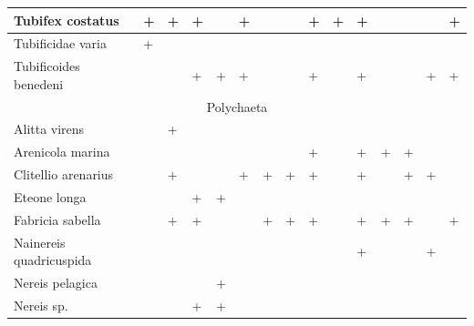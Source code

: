 \begin{footnotesize}
\begin{longtable}{|p{2cm}|p{0.4cm}p{0.4cm}|p{0.4cm}p{0.4cm}|p{0.4cm}p{0.4cm}|p{0.35cm}p{0.35cm}p{0.35cm}|p{1cm}|p{0.5cm}p{0.5cm}|p{1cm}|p{1cm}|}
Tubifex costatus          & +         & +         & +         &           & +         &           &          & +        & +        & +               &          &          &          & +          \\  \hline
Tubificidae varia         & +         &           &           &           &           &           &          &          &          &                 &          &          &          &            \\  \hline
Tubificoides benedeni     &           &           & +         & +         & +         &           &          & +        &          & +               &          &          & +        & +          \\ \hline
\multicolumn{15}{|c|}{Polychaeta} \\ \hline
Alitta virens             &           & +         &           &           &           &           &          &          &          &                 &          &          &          &            \\  \hline
Arenicola marina          &           &           &           &           &           &           &          & +        &          & +               & +        & +        &          &            \\  \hline
Clitellio arenarius       &           & +         &           &           & +         & +         & +        & +        &          & +               &          & +        & +        &            \\  \hline
Eteone longa              &           &           & +         & +         &           &           &          &          &          &                 &          &          &          &            \\  \hline
Fabricia sabella          &           & +         & +         &           &           & +         & +        & +        &          & +               & +        & +        &          & +          \\  \hline
Nainereis quadricuspida   &           &           &           &           &           &           &          &          &          & +               &          &          & +        &            \\  \hline
Nereis pelagica           &           &           &           & +         &           &           &          &          &          &                 &          &          &          &            \\  \hline
Nereis sp.                &           &           & +         & +         &           &           &          &          &          &                 &          &          &          &            \\  \hline

\end{longtable}
\end{footnotesize}
